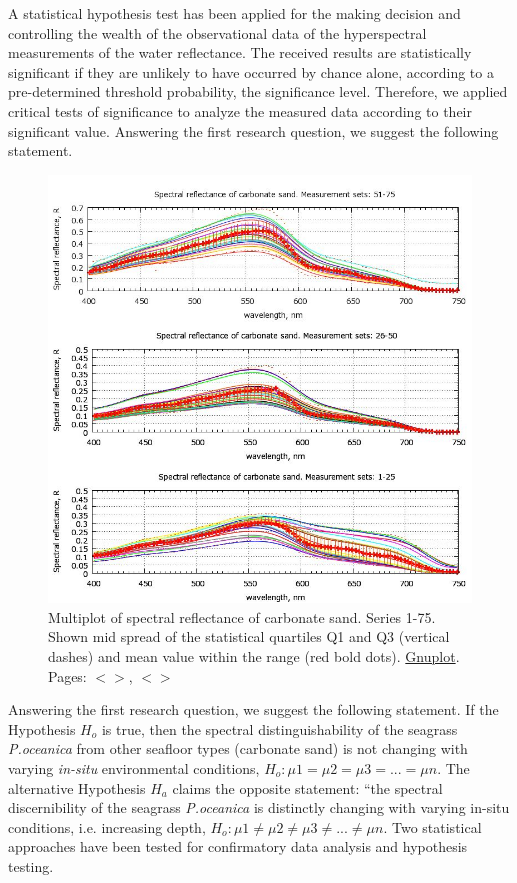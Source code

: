\documentclass[11pt]{article}
\begin{document}
A statistical hypothesis test has been applied for the making decision and controlling the wealth of the observational data of the hyperspectral measurements of the water reflectance.
The received results are statistically significant if they are unlikely to have occurred by chance alone,
according to a pre-determined threshold probability, the significance level. Therefore, we applied
critical tests of significance to analyze the measured data according to their significant value.
Answering the first research question, we suggest the following statement.

\begin{figure}[H]
	\begin{center}
		\includegraphics[scale=0.5]{GNU-16.jpg}
		\caption{Multiplot of spectral reflectance of carbonate sand. Series 1-75. Shown mid spread of the statistical quartiles Q1 and Q3 (vertical dashes) and	mean value within the range (red bold dots). \href{http://www.gnuplot.info/}{Gnuplot}. Pages: $<$\pageref{page-21}$>$, $<$\pageref{page-41}$>$­}
		\label{fig:4.14}
	\end{center}
\end{figure}
%
Answering the first research question, we suggest the following statement. If the Hypothesis $H_o$ is true, then the spectral distinguishability of the seagrass \textit{P.oceanica} from other seafloor types (carbonate sand) is not changing with varying \textit{in-situ} environmental conditions, $H_o: \mu1 =\mu2 =\mu3=...= \mu n$.  The alternative Hypothesis $H_a$ claims the opposite statement: “the spectral discernibility of the seagrass \textit{P.oceanica} is distinctly changing with varying in-situ conditions, i.e. increasing depth, $H_o: \mu1\neq\mu2\neq\mu3\neq...\neq\mu n$.
Two statistical approaches have been tested for confirmatory data analysis and hypothesis testing.
\end{document}
